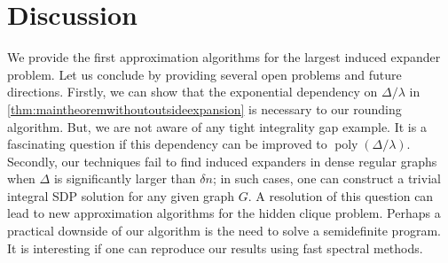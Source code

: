 \documentclass[11pt]{article}
\DeclareMathOperator{\poly}{poly}
\begin{document}
\section{Discussion}
We provide the first approximation algorithms for the largest induced expander problem. Let us conclude by providing several open problems and future directions. Firstly, we can show that the  exponential dependency on $\Delta/\lambda$ in \autoref{thm:maintheoremwithoutoutsideexpansion} is necessary to our rounding algorithm. But, we are not aware of any tight integrality gap example. It is a fascinating question if this dependency can be improved to $\poly(\Delta/\lambda)$. Secondly, our techniques fail to find induced expanders in dense regular graphs when $\Delta$ is significantly larger than $\delta n$; in such cases, one can construct a trivial integral SDP solution for any given graph $G$. A resolution of this question can lead to new approximation algorithms for the hidden clique problem. Perhaps a practical downside of our algorithm is the need to solve a semidefinite program. It is interesting if one can reproduce our results using fast spectral methods. 








\end{document}
